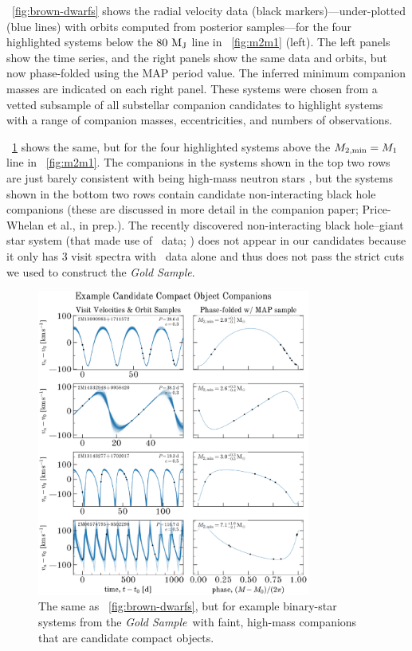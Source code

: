 \documentclass[modern]{aastex63}
\newcommand{\goldsample}{\textit{Gold Sample}}
\begin{document}
\figurename~\ref{fig:brown-dwarfs} shows the radial velocity data (black
markers)---under-plotted (blue lines) with orbits computed from posterior
samples---for the four highlighted systems below the $80~\mathrm{M}_{\mathrm{J}}$ line in
\figurename~\ref{fig:m2m1} (left).
The left panels show the time series, and the right panels show the same data
and orbits, but now phase-folded using the MAP period value.
The inferred minimum companion masses are indicated on each right panel.
These systems were chosen from a vetted subsample of all substellar companion
candidates to highlight systems with a range of companion masses,
eccentricities, and numbers of observations.

\figurename~\ref{fig:compact-objects} shows the same, but for the four
highlighted systems above the $M_{2, {\rm min}} = M_1$ line in
\figurename~\ref{fig:m2m1}.
The companions in the systems shown in the top two rows are just barely
consistent with being high-mass neutron stars \citep[e.g.,][]{Cromartie:2019},
but the systems shown in the bottom two rows contain candidate non-interacting
black hole companions (these are discussed in more detail in the companion
paper; Price-Whelan et al., in prep.).
The recently discovered non-interacting black hole--giant star system (that made
use of \apogee\ data; \citealt{Thompson:2019}) does not appear in our candidates
because it only has 3 visit spectra with \apogee\ data alone and thus does not
pass the strict cuts we used to construct the \goldsample.

\begin{figure}[!t]
    \begin{center}
    \includegraphics[width=0.8\textwidth]{example-compact-objects.pdf}
    \end{center}
    \caption{%
    The same as \figurename~\ref{fig:brown-dwarfs}, but for example binary-star
    systems from the \goldsample\ with faint, high-mass companions that are
    candidate compact objects.
    \label{fig:compact-objects}
    }
\end{figure}
\end{document}
